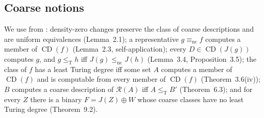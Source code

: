 \documentclass[11pt,letterpaper]{article}
\theoremstyle{definition}
\numberwithin{equation}{section}
\newcommand{\leT}{\le_{\mathrm T}}
\newcommand{\lenc}{\le_{\mathrm{nc}}}
\newcommand{\eqnc}{\equiv_{\mathrm{nc}}}
\newcommand{\CD}{\operatorname{CD}}
\newcommand{\J}{J}
\newcommand{\Rc}{\mathcal R}
\begin{document}
\subsection{Coarse notions}
We use from \cite{Synthesis}: density-zero changes preserve the class of coarse descriptions and are uniform equivalences (Lemma~2.1); a representative $g\eqnc f$ computes a member of $\CD(f)$ (Lemma~2.3, self-application); every $D\in\CD(\J(g))$ computes $g$, and $g\leT h$ iff $\J(g)\lenc\J(h)$ (Lemma~3.4, Proposition~3.5); the class of $f$ has a least Turing degree iff some set $A$ computes a member of $\CD(f)$ and is computable from every member of $\CD(f)$ (Theorem~3.6(iv)); $B$ computes a coarse description of $\Rc(A)$ iff $A\leT B'$ (Theorem~6.3); and for every $Z$ there is a binary $F=\J(Z)\oplus W$ whose coarse classes have no least Turing degree (Theorem~9.2).
\end{document}
